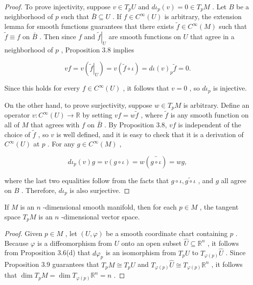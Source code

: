 \begin{proof}
\leanok
To prove injectivity, suppose $v \in  {T}_{p}U$ and $d{\iota }_{p}\left( v\right)  = 0 \in  {T}_{p}M$ . Let $B$ be a neighborhood of $p$ such that $\bar{B} \subseteq  U$ . If $f \in  {C}^{\infty }\left( U\right)$ is arbitrary, the extension lemma for smooth functions guarantees that there exists $\widetilde{f} \in  {C}^{\infty }\left( M\right)$ such that $\widetilde{f} \equiv  f$ on $\bar{B}$ . Then since $f$ and ${\left. \widetilde{f}\right| }_{U}$ are smooth functions on $U$ that agree in a neighborhood of $p$ , Proposition 3.8 implies

\[
{vf} = v\left( {\left. \widetilde{f}\right| }_{U}\right)  = v\left( {\widetilde{f} \circ  \iota }\right)  = {d\iota }{\left( v\right) }_{p}\widetilde{f} = 0.
\]

Since this holds for every $f \in  {C}^{\infty }\left( U\right)$ , it follows that $v = 0$ , so $d{\iota }_{p}$ is injective.

On the other hand, to prove surjectivity, suppose $w \in  {T}_{p}M$ is arbitrary. Define an operator $v : {C}^{\infty }\left( U\right)  \rightarrow  \mathbb{R}$ by setting ${vf} = w\widetilde{f}$ , where $\widetilde{f}$ is any smooth function on all of $M$ that agrees with $f$ on $\bar{B}$ . By Proposition 3.8, ${vf}$ is independent of the choice of $\widetilde{f}$ , so $v$ is well defined, and it is easy to check that it is a derivation of ${C}^{\infty }\left( U\right)$ at $p$ . For any $g \in  {C}^{\infty }\left( M\right)$ ,

\[
d{\iota }_{p}\left( v\right) g = v\left( {g \circ  \iota }\right)  = w\left( \overset{\text{ ⏜ }}{g \circ  \iota }\right)  = {wg},
\]

where the last two equalities follow from the facts that $g \circ  \iota ,\widetilde{g \circ  \iota }$ , and $g$ all agree on $B$ . Therefore, $d{\iota }_{p}$ is also surjective.
\end{proof}

\begin{proposition}
\label{prop:3-10}
\leanok
{}
If $M$ is an $n$ -dimensional smooth manifold, then for each $p \in  M$ , the tangent space ${T}_{p}M$ is an $n$ -dimensional vector space.
\end{proposition}

\begin{proof}
\leanok
Given $p \in  M$ , let $\left( {U,\varphi }\right)$ be a smooth coordinate chart containing $p$ . Because $\varphi$ is a diffeomorphism from $U$ onto an open subset $\widehat{U} \subseteq  {\mathbb{R}}^{n}$ , it follows from Proposition 3.6(d) that $d{\varphi }_{p}$ is an isomorphism from ${T}_{p}U$ to ${T}_{\varphi \left( p\right) }\widehat{U}$ . Since Proposition 3.9 guarantees that ${T}_{p}M \cong  {T}_{p}U$ and ${T}_{\varphi \left( p\right) }\widehat{U} \cong  {T}_{\varphi \left( p\right) }{\mathbb{R}}^{n}$ , it follows that $\dim {T}_{p}M = \dim {T}_{\varphi \left( p\right) }{\mathbb{R}}^{n} = n$ .
\end{proof}


